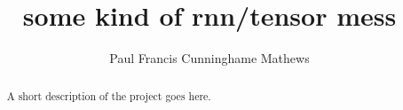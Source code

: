 \documentclass[11pt
              , a4paper
              , twoside
              , openright
              ]{report}
\title{some kind of rnn/tensor mess}
\author{Paul Francis Cunninghame Mathews}
\date{}
\begin{document}
\frontmatter



\begin{abstract}

A short description of the project goes here.

\end{abstract}


\maketitle



\tableofcontents



\mainmatter









\appendix



\backmatter



%
%
%
\printbibliography
\end{document}
